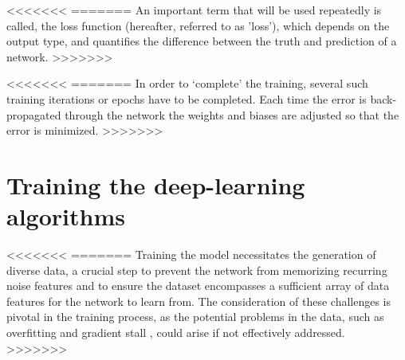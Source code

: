 \documentclass{aa}
\begin{document}
{{%
<<<<<<<
=======
An important term that will be used repeatedly is called, the loss function (hereafter, referred to as 'loss'), which depends on the output type, and quantifies the difference between the truth and prediction of a network.
>>>>>>>
    
<<<<<<<
=======
In order to `complete' the training, several such training iterations or epochs have to be completed.
Each time the error is back-propagated through the network the weights and biases are adjusted so that the error is minimized.
>>>>>>>


\section{Training the deep-learning algorithms}\label{sec: training ML}
<<<<<<<
=======
Training the model necessitates the generation of diverse data, a crucial step to prevent the network from memorizing recurring noise features and to ensure the dataset encompasses a sufficient array of data features for the network to learn from. The consideration of these challenges is pivotal in the training process, as the potential problems in the data, such as overfitting \citep[][]{dietterich1995overfitting} and gradient stall \citep[][]{patel2017sgd}, could arise if not effectively addressed.
>>>>>>>

}}
\end{document}

